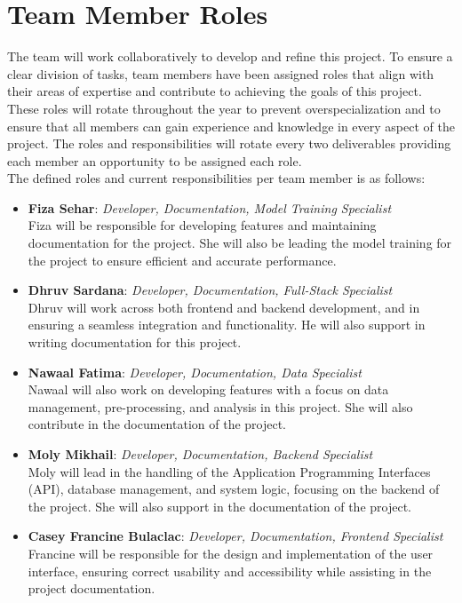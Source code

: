 \documentclass{article}
\begin{document}
\section{Team Member Roles}

The team will work collaboratively to develop and refine this project. To ensure a clear 
division of tasks, team members have been assigned roles that 
align with their areas of expertise and contribute to achieving the goals 
of this project. These roles will rotate throughout the year to prevent overspecialization
and to ensure that all members can gain experience and knowledge in 
every aspect of the project. The roles and responsibilities will rotate every two deliverables 
providing each member an opportunity to be assigned each role.\\[1ex]
The defined roles and current responsibilities per team member is as follows: 
\begin{itemize}
	\item \textbf{Fiza Sehar}: \textit{Developer, Documentation, Model Training Specialist} \\
	Fiza will be responsible for developing features and maintaining documentation for the 
  project. She will also be leading the model training for the project to ensure 
  efficient and accurate performance.
	\item \textbf{Dhruv Sardana}: \textit{Developer, Documentation, Full-Stack Specialist} \\
	Dhruv will work across both frontend and backend development, and in ensuring a 
  seamless integration and functionality. He will also support in writing documentation
  for this project. 
	\item \textbf{Nawaal Fatima}: \textit{Developer, Documentation, Data Specialist} \\
	Nawaal will also work on developing features with a 
  focus on data management, pre-processing, and analysis in this project. She 
  will also contribute in the documentation of the project.
	\item \textbf{Moly Mikhail}: \textit{Developer, Documentation, Backend Specialist} \\
	Moly will lead in the handling of the Application Programming Interfaces (API), database management, and system logic, focusing on 
  the backend of the project. She will also support in the documentation of the project.
	\item \textbf{Casey Francine Bulaclac}: \textit{Developer, Documentation, Frontend Specialist} \\
	Francine will be responsible for the design and implementation of the user interface, 
  ensuring correct usability and accessibility while assisting in the project 
  documentation.
\end{itemize}
\end{document}
